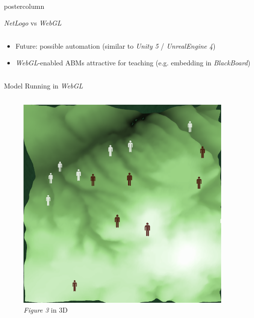 \documentclass[final,hyperref={pdfpagelabels=false}]{beamer}
\begin{document}
\begin{frame}
\begin{columns}[T]
\begin{column}{.33\textwidth}
\begin{beamercolorbox}[center,wd=\textwidth]{postercolumn}
\begin{minipage}[T]{.95\textwidth}
{\begin{block}{\textit{NetLogo} vs \textit{WebGL}}
\begin{columns}
\begin{column}{.99\textwidth}
\begin{itemize}
\begin{itemize}
                        \item Future: possible automation (similar to \textit{Unity 5} / \textit{UnrealEngine 4})
                        \item \textit{WebGL}-enabled ABMs attractive for teaching (e.g. embedding in \textit{BlackBoard})
                      \end{itemize}
                  \end{itemize}
                \end{column}
              \end{columns}
            \end{block}
            \vfill
            \begin{block}{Model Running in \textit{WebGL}}
              \centering
              \begin{columns}[T]
                \begin{column}{.32\textwidth}
                  \begin{figure}[h!]
                  \includegraphics[width=1.0\linewidth]{images/fp25}
                  \caption{\textit{Figure 3} in 3D}
                  \end{figure}
                \end{column}         
                \begin{column}{.32\textwidth}

\end{column}
\end{columns}
\end{block}}
\end{minipage}
\end{beamercolorbox}
\end{column}
\end{columns}
\end{frame}
\end{document}
